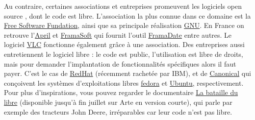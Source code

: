 \documentclass[10pt]{article}
\begin{document}
Au contraire, certaines associations et entreprises promeuvent les logiciels \og open source \fg, dont le code est libre.
L'association la plus connue dans ce domaine est la \href{https://www.fsf.org/}{Free Software Fundation}, ainsi que
sa principale réalisation \href{https://www.gnu.org/}{GNU}. En France on retrouve l'\href{https://www.april.org/}{April} et
\href{https://framasoft.org/fr/}{FramaSoft} qui fournit l'outil \href{https://framadate.org/}{FramaDate} entre autres.
Le logiciel \href{https://www.videolan.org/index.fr.html}{VLC} fonctionne également grâce à une association.
Des entreprises aussi entretiennent le logiciel libre : le code est public, l'utilisation
est libre de droits, mais pour demander l'implantation de fonctionnalités spécifiques alors il faut
payer. C'est le cas de \href{https://www.redhat.com/fr}{RedHat} (récemment rachetée par IBM), et de \href{https://www.canonical.com/}{Canonical}
qui conçoivent les systèmes d'exploitations libres \href{https://getfedora.org/fr/}{fedora} et \href{https://www.ubuntu.com/download}{Ubuntu}, respectivement.
Pour plus d'inspirations, vous pouvez regarder le documentaire \href{https://www.arte.tv/fr/videos/077346-000-A/internet-ou-la-revolution-du-partage/}{La bataille du libre}
(disponible jusqu'à fin juillet sur Arte en version courte), qui parle par exemple des tracteurs John Deere, irréparables car leur code n'est pas libre.
\end{document}
